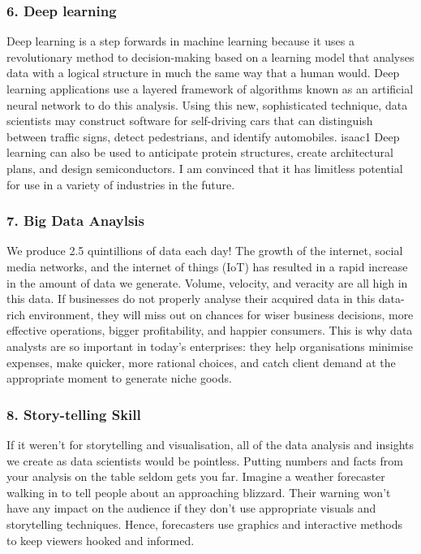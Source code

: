 \documentclass[a4paper, 11pt]{report}
\begin{document}
    \subsubsection{6. Deep learning}
    Deep learning is a step forwards in machine learning because it uses a revolutionary method to decision-making based on a learning model that analyses data with a logical structure in much the same way that a human would.\cite{isaac5} Deep learning applications use a layered framework of algorithms known as an artificial neural network to do this analysis.\cite{isaac5} Using this new, sophisticated technique, data scientists may construct software for self-driving cars that can distinguish between traffic signs, detect pedestrians, and identify automobiles. {isaac1} Deep learning can also be used to anticipate protein structures, create architectural plans, and design semiconductors. I am convinced that it has limitless potential for use in a variety of industries in the future.

    \subsubsection{7. Big Data Anaylsis}
    We produce 2.5 quintillions of data each day!\cite{isaac1} The growth of the internet, social media networks, and the internet of things (IoT) has resulted in a rapid increase in the amount of data we generate. Volume, velocity, and veracity are all high in this data.\cite{isaac6} If businesses do not properly analyse their acquired data in this data-rich environment, they will miss out on chances for wiser business decisions, more effective operations, bigger profitability, and happier consumers.\cite{isaac6} This is why data analysts are so important in today's enterprises: they help organisations minimise expenses, make quicker, more rational choices, and catch client demand at the appropriate moment to generate niche goods.\cite{isaac1}

    \subsubsection{8. Story-telling Skill}
    If it weren't for storytelling and visualisation, all of the data analysis and insights we create as data scientists would be pointless. Putting numbers and facts from your analysis on the table seldom gets you far. Imagine a weather forecaster walking in to tell people about an approaching blizzard. Their warning won't have any impact on the audience if they don't use appropriate visuals and storytelling techniques.\cite{isaac7} Hence, forecasters use graphics and interactive methods to keep viewers hooked and informed. \cite{isaac7}
\end{document}
